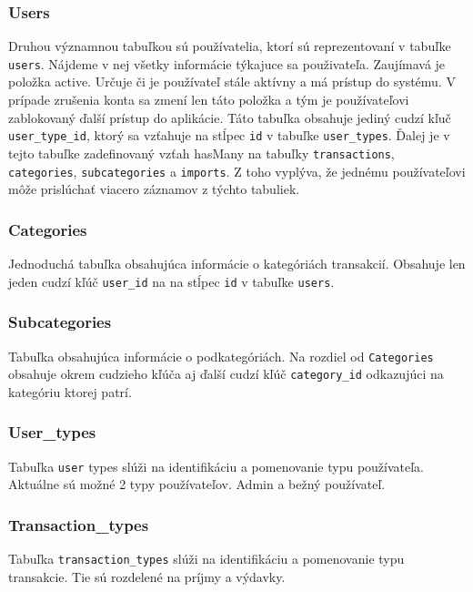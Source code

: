 \documentclass[12pt,oneside]{book}
\begin{document}
\subsubsection{Users}
Druhou významnou tabuľkou sú používatelia, ktorí sú reprezentovaní v tabuľke \texttt{users}. Nájdeme v nej všetky informácie týkajuce sa použivateľa. Zaujímavá je položka active. Určuje či je používateľ stále aktívny a má prístup do systému. V prípade zrušenia konta sa zmení len táto položka a tým je používateľovi zablokovaný ďalší prístup do aplikácie. Táto tabuľka obsahuje jediný cudzí kľuč \texttt{user\_type\_id}, ktorý sa vzťahuje na stĺpec \texttt{id} v tabuľke \texttt{user\_types}. Ďalej je v tejto tabuľke zadefinovaný vzťah hasMany na tabuľky \texttt{transactions}, \texttt{categories}, \texttt{subcategories} a \texttt{imports}. Z toho vyplýva, že jednému používateľovi môže prislúchať viacero záznamov z týchto tabuliek.
\subsubsection{Categories}
Jednoduchá tabuľka obsahujúca informácie o kategóriách transakcií. Obsahuje len jeden cudzí kľúč \texttt{user\_id} na na stĺpec \texttt{id} v tabuľke \texttt{users}. 
\subsubsection{Subcategories}
Tabuľka obsahujúca informácie o podkategóriách. Na rozdiel od \texttt{Categories} obsahuje okrem cudzieho kľúča aj ďalší cudzí kľúč \texttt{category\_id} odkazujúci na kategóriu ktorej patrí.
\subsubsection{User\_types}
Tabuľka \texttt{user} types slúži na identifikáciu a pomenovanie typu používateľa. Aktuálne sú možné 2 typy používateľov. Admin a bežný používateľ.
\subsubsection{Transaction\_types}
Tabuľka \texttt{transaction\_types} slúži na identifikáciu a pomenovanie typu transakcie. Tie sú rozdelené na príjmy a výdavky.
\end{document}
